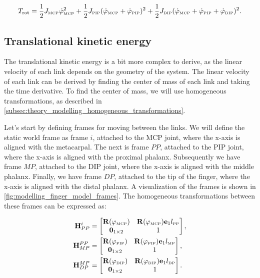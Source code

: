 \begin{equation}
    \label{eq:modelling_rot_kinetic_energy}
    T_{\text{rot}} = \frac{1}{2}J_{{\scriptscriptstyle\mathrm{MCP}}}\dot{\varphi}_{{\scriptscriptstyle\mathrm{MCP}}}^2 + \frac{1}{2}J_{{\scriptscriptstyle\mathrm{PIP}}}(\dot{\varphi}_{{\scriptscriptstyle\mathrm{MCP}}} + \dot{\varphi}_{{\scriptscriptstyle\mathrm{PIP}}})^2 + \frac{1}{2}J_{{\scriptscriptstyle\mathrm{DIP}}}(\dot{\varphi}_{{\scriptscriptstyle\mathrm{MCP}}} + \dot{\varphi}_{{\scriptscriptstyle\mathrm{PIP}}} + \dot{\varphi}_{{\scriptscriptstyle\mathrm{DIP}}})^2.
\end{equation}

\subsection*{Translational kinetic energy}

The translational kinetic energy is a bit more complex to derive, as the linear velocity of each link depends on the geometry of the system. The linear velocity of each link can be derived by finding the center of mass of each link and taking the time derivative. To find the center of mass, we will use homogeneous transformations, as described in \cref{subsec:theory_modelling_homogeneous_transformations}. 

Let's start by defining frames for moving between the links. We will define the static world frame as frame $i$, attached to the MCP joint, where the x-axis is aligned with the metacarpal. The next is frame $PP$, attached to the PIP joint, where the x-axis is aligned with the proximal phalanx. Subsequently we have frame $MP$, attached to the DIP joint, where the x-axis is aligned with the middle phalanx. Finally, we have frame $DP$, attached to the tip of the finger, where the x-axis is aligned with the distal phalanx. A visualization of the frames is shown in \cref{fig:modelling_finger_model_frames}. The homogeneous transformations between these frames can be expressed as:

\begin{equation}
    \label{eq:modelling_homogeneous_transformations}
    \begin{aligned}
        \mathbf{H}_{PP}^i &= \begin{bmatrix}
        \mathbf{R}(\varphi_{{\scriptscriptstyle\mathrm{MCP}}}) & \mathbf{R}(\varphi_{{\scriptscriptstyle\mathrm{MCP}}})\mathbf{e}_1 l_{{\scriptscriptstyle\mathrm{PP}}}\\
        \mathbf{0}_{1 \times 2} & 1
    \end{bmatrix}, \\
    \mathbf{H}_{MP}^{PP} &= \begin{bmatrix}
        \mathbf{R}(\varphi_{{\scriptscriptstyle\mathrm{PIP}}}) & \mathbf{R}(\varphi_{{\scriptscriptstyle\mathrm{PIP}}})\mathbf{e}_1 l_{{\scriptscriptstyle\mathrm{MP}}}\\
        \mathbf{0}_{1 \times 2} & 1
    \end{bmatrix}, \\
    \mathbf{H}_{DP}^{MP} &= \begin{bmatrix}
        \mathbf{R}(\varphi_{{\scriptscriptstyle\mathrm{DIP}}}) & \mathbf{R}(\varphi_{{\scriptscriptstyle\mathrm{DIP}}})\mathbf{e}_1 l_{{\scriptscriptstyle\mathrm{DP}}}\\
        \mathbf{0}_{1 \times 2} & 1
    \end{bmatrix}.
    \end{aligned}
\end{equation}

